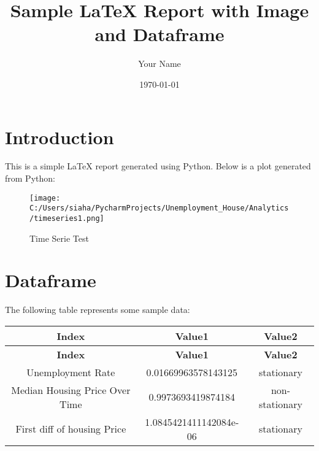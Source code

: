 \documentclass{article}
\begin{document}
\title{Sample LaTeX Report with Image and Dataframe}
\author{Your Name}
\date{\today}
\maketitle

\section{Introduction}
This is a simple LaTeX report generated using Python. Below is a plot generated from Python:

\begin{figure}[h!]
\centering
\texttt{[image: C:/Users/siaha/PycharmProjects/Unemployment\_House/Analytics/timeseries1.png]}
\caption{Time Serie Test}
\end{figure}


\section{Dataframe}
The following table represents some sample data:

\begin{longtable}{|c|c|c|}
\hline
\textbf{Index} & \textbf{Value1} & \textbf{Value2} \\
\hline
\endfirsthead
\hline
\textbf{Index} & \textbf{Value1} & \textbf{Value2} \\
\hline
\endhead
Unemployment Rate & 0.01669963578143125 & stationary  \\
Median Housing Price Over Time & 0.9973693419874184 & non-stationary  \\
First diff of housing Price & 1.0845421411142084e-06 & stationary  \\


\end{longtable}
\end{document}

